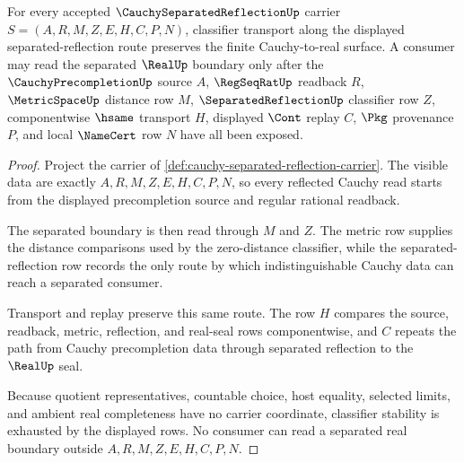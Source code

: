 \begin{theorem}
\label{thm:cauchy-separated-reflection-classifier-stability}
For every accepted $\CauchySeparatedReflectionUp$ carrier $S=(A,R,M,Z,E,H,C,P,N)$, classifier transport along the displayed separated-reflection route preserves the finite Cauchy-to-real surface. A consumer may read the separated $\RealUp$ boundary only after the $\CauchyPrecompletionUp$ source $A$, $\RegSeqRatUp$ readback $R$, $\MetricSpaceUp$ distance row $M$, $\SeparatedReflectionUp$ classifier row $Z$, componentwise $\hsame$ transport $H$, displayed $\Cont$ replay $C$, $\Pkg$ provenance $P$, and local $\NameCert$ row $N$ have all been exposed.
\end{theorem}
\begin{proof}
Project the carrier of \autoref{def:cauchy-separated-reflection-carrier}. The visible data are exactly $A,R,M,Z,E,H,C,P,N$, so every reflected Cauchy read starts from the displayed precompletion source and regular rational readback.

The separated boundary is then read through $M$ and $Z$. The metric row supplies the distance comparisons used by the zero-distance classifier, while the separated-reflection row records the only route by which indistinguishable Cauchy data can reach a separated consumer.

Transport and replay preserve this same route. The row $H$ compares the source, readback, metric, reflection, and real-seal rows componentwise, and $C$ repeats the path from Cauchy precompletion data through separated reflection to the $\RealUp$ seal.

Because quotient representatives, countable choice, host equality, selected limits, and ambient real completeness have no carrier coordinate, classifier stability is exhausted by the displayed rows. No consumer can read a separated real boundary outside $A,R,M,Z,E,H,C,P,N$.
\end{proof}



